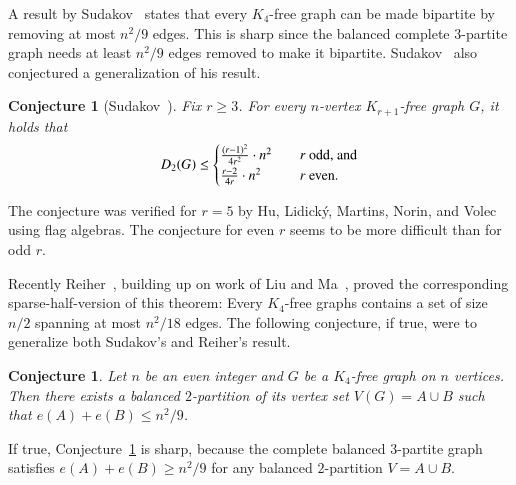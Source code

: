 \documentclass[11pt]{article}
\newtheorem{conj}[theo]{Conjecture}
\theoremstyle{definition}
\numberwithin{theo}{section}
\begin{document}
A result by Sudakov~\cite{MR2359832} states that every $K_4$-free graph can be made bipartite by removing at most $n^2/9$ edges. This is sharp since the balanced complete 3-partite graph needs at least $n^2/9$ edges removed to make it bipartite. Sudakov~\cite{MR2359832} also conjectured a generalization of his result.   
\begin{conj}[Sudakov~\cite{MR2359832}]\label{conj:benny}
Fix $r\ge 3$. For every $n$-vertex $K_{r+1}$-free graph $G$, it holds that
\[
D_2(G) \leq \begin{cases} \frac{(r-1)^2}{4r^2}\cdot n^2   &\quad r\hbox{ odd, and} \\ \frac{r-2}{4r}\cdot n^2   &\quad r\hbox{ even.} \end{cases}
\]
\end{conj}
The conjecture was verified for $r=5$ by Hu, Lidick\'y, Martins, Norin, and Volec~\cite{flagmulti} using flag algebras. The conjecture for even $r$ seems to be more difficult than for odd $r$.

Recently Reiher~\cite{ReiherK4}, building up on work of Liu and Ma~\cite{LiuMaK4}, proved the corresponding sparse-half-version of this theorem: 
Every $K_4$-free graphs contains a set of size $n/2$ spanning at most $n^2/18$ edges. The following conjecture, if true, were to generalize both Sudakov's and Reiher's result. 
\begin{conj}
\label{conj:sparsedo}
Let $n$ be an even integer and $G$ be a $K_4$-free graph on $n$ vertices. Then there exists a balanced $2$-partition of its vertex set $V(G)=A\cup B$ such that $e(A)+e(B)\leq n^2/9$.
\end{conj}
If true, Conjecture~\ref{conj:sparsedo} is sharp, because the complete balanced $3$-partite graph satisfies $e(A)+e(B)\geq n^2/9$ for any balanced $2$-partition $V=A\cup B$.
\end{document}
